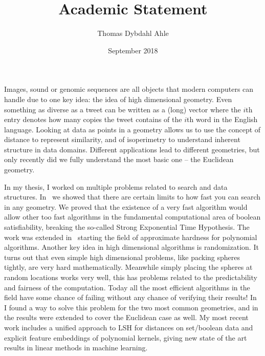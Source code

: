 \documentclass[10pt]{article}
\title{Academic Statement}
\author{Thomas Dybdahl Ahle}
\date{September 2018}
\begin{document}
\maketitle


Images, sound or genomic sequences are all objects that modern computers can handle due to one key idea: the idea of high dimensional geometry.
Even something as diverse as a tweet can be written as a (long) vector where the $i$th entry denotes how many copies the tweet contains of the $i$th word in the English language.
Looking at data as points in a geometry allows us to use the concept of distance to represent similarity, and of isoperimetry to understand inherent structure in data domains.
Different applications lead to different geometries, but only recently did we fully understand the most basic one -- the Euclidean geometry.


In my thesis, I worked on multiple problems related to search and data structures.
In~\cite{ahle2016complexity} we showed that there are certain limits to how fast you can search in any geometry.
We proved that the existence of a very fast algorithm would allow other too fast algorithms in the fundamental computational area of boolean satisfiability, breaking the so-called Strong Exponential Time Hypothesis.
The work was extended in~\cite{DBLP:journals/corr/AbboudR17} starting the field of approximate hardness for polynomial algorithms.
%
Another key idea in high dimensional algorithms is randomization.
It turns out that even simple high dimensional problems, like packing spheres tightly, are very hard mathematically.
Meanwhile simply placing the spheres at random locations works very well,
this has problems related to the predictability and fairness of the computation.
Today all the most efficient algorithms in the field have some chance of failing without any chance of verifying their results!
In~\cite{ahle2017optimal} I found a way to solve this problem for the two most common geometries, and in~\cite{wei2019optimal} the results were extended to cover the Euclidean case as well.
%
My most recent work includes a unified approach to LSH for distances on set/boolean data and explicit feature embeddings of polynomial kernels, giving new state of the art results in linear methods in machine learning.
\end{document}
